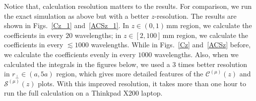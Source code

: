\documentclass[]{report}
\begin{document}
\newpage
Notice that, calculation resolution matters to the results. For comparison, we run the exact simulation as above but with a better $ z $-resolution.  The results are shown in Figs.~\ref{Cz_1} and~\ref{ACSz_1}. In $ z\in (0,1)\,\mathrm{mm} $ region, we calculate the coefficients in every $ 20 $ wavelengths; in $ z\in[2,100]\,\mathrm{mm} $ region, we calculate the coefficients in every $ \lesssim 1000 $ wavelengths. While in Figs.~\ref{Cz} and~\ref{ACSz} before, we calculate the coefficients evenly in every $ 1000 $ wavelengths. Also, when we calculated the integrals in the figures below, we used a $ 3 $ times better resolution in $ r_\perp\in(a,5a) $ region, which gives more detailed features of the $ \mathcal{C}^{(\mu)} (z)$ and $ \mathcal{S}^{(\mu)}(z) $ plots. With this improved resolution, it takes more than one hour to run the full calculation on a Thinkpad X200 laptop. 
\end{document}
